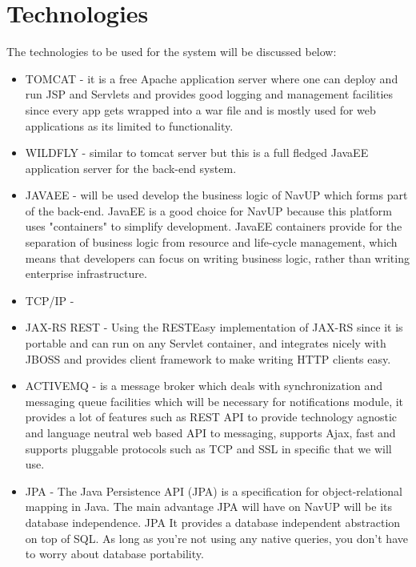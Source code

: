 
\section{Technologies}
The technologies to be used for the system will be discussed below:
\begin{itemize}
	\item TOMCAT - it is a free Apache application server where one can deploy and run JSP and Servlets and provides good logging and management facilities since every app gets wrapped into a war file and is mostly used for web applications as its limited to functionality.
	
	\item WILDFLY - similar to tomcat server but this is a full fledged JavaEE application server for the back-end system.
	
	\item JAVAEE - will be used develop the business logic of NavUP which forms part of the back-end. JavaEE is a good choice for NavUP because this platform uses "containers" to simplify development. JavaEE containers provide for the separation of business logic from resource and life-cycle management, which means that developers can focus on writing business logic, rather than writing enterprise infrastructure. 
	
	\item TCP/IP - 
	
	\item JAX-RS REST - Using the RESTEasy implementation of JAX-RS since it is portable and can run on any Servlet container, and integrates nicely with JBOSS and provides client framework to make writing HTTP clients easy.
	
	\item ACTIVEMQ - is a message broker which deals with synchronization and messaging queue facilities which will be necessary for notifications module, it provides a lot of features such as REST API to provide  technology agnostic and language neutral web based API to messaging, supports Ajax, fast and supports pluggable protocols such as TCP and SSL in specific that we will use. 
	
	\item JPA - The Java Persistence API (JPA) is a specification for object-relational mapping in Java. The main advantage JPA will have on NavUP will be its database independence. JPA It provides a database independent abstraction on top of SQL. As long as you're not using any native queries, you don't have to worry about database portability. 
	

\end{itemize}
